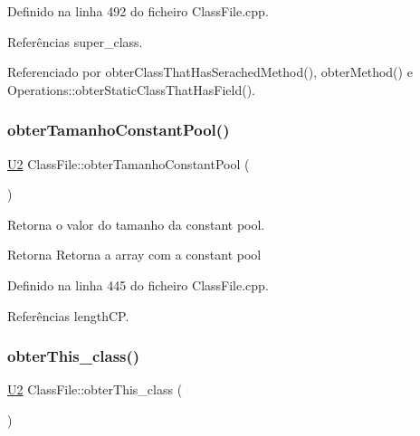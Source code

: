 Definido na linha 492 do ficheiro Class\+File.\+cpp.



Referências super\+\_\+class.



Referenciado por obter\+Class\+That\+Has\+Serached\+Method(), obter\+Method() e Operations\+::obter\+Static\+Class\+That\+Has\+Field().

\mbox{\label{classClassFile_a8b60418144c498b9d9545b1784bddf21}} 
\subsubsection{\texorpdfstring{obter\+Tamanho\+Constant\+Pool()}{obterTamanhoConstantPool()}}
{\footnotesize\ttfamily \hyperlink{BasicTypes_8h_a90240657108b1b457eef9d3f76e0202e}{U2} Class\+File\+::obter\+Tamanho\+Constant\+Pool (\begin{DoxyParamCaption}{ }\end{DoxyParamCaption})}



Retorna o valor do tamanho da constant pool. 

\begin{DoxyReturn}{Retorna}
Retorna a array com a constant pool 
\end{DoxyReturn}


Definido na linha 445 do ficheiro Class\+File.\+cpp.



Referências length\+CP.

\mbox{\label{classClassFile_aec88c5432526d16b546ed59e5cec2136}} 
\subsubsection{\texorpdfstring{obter\+This\+\_\+class()}{obterThis\_class()}}
{\footnotesize\ttfamily \hyperlink{BasicTypes_8h_a90240657108b1b457eef9d3f76e0202e}{U2} Class\+File\+::obter\+This\+\_\+class (\begin{DoxyParamCaption}{ }\end{DoxyParamCaption})}



